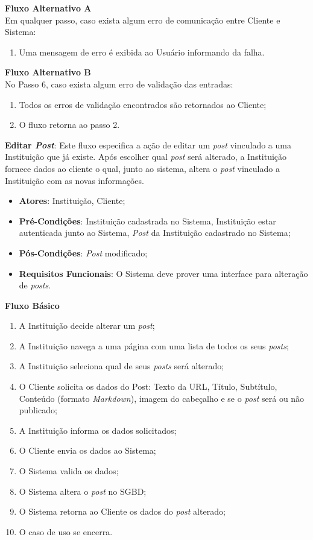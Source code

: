 \begin{anexosenv}
\begin{lista}
    \textbf{Fluxo Alternativo A} \\
    Em qualquer passo, caso exista algum erro de comunicação entre Cliente e Sistema:
    \begin{enumerate}
    \item Uma mensagem de erro é exibida ao Usuário informando da falha.
    \end{enumerate}
    
    \textbf{Fluxo Alternativo B} \\
    No Passo 6, caso exista algum erro de validação das entradas:
    \begin{enumerate}
    \item Todos os erros de validação encontrados são retornados ao Cliente;
    \item O fluxo retorna ao passo 2.
    \end{enumerate}
  
  
  
  \item \textbf{Editar \emph{Post}}: Este fluxo especifica a ação de editar um \emph{post} vinculado a uma Instituição que já existe. Após escolher qual \emph{post} será alterado, a Instituição fornece dados ao cliente o qual, junto ao sistema, altera o \emph{post} vinculado a Instituição com as novas informações.
    \begin{itemize}
    \item \textbf{Atores}: Instituição, Cliente;
    \item \textbf{Pré-Condições}: Instituição cadastrada no Sistema, Instituição estar autenticada junto ao Sistema, \emph{Post} da Instituição cadastrado no Sistema;
    \item \textbf{Pós-Condições}: \emph{Post} modificado;
    \item \textbf{Requisitos Funcionais}: O Sistema deve prover uma interface para alteração de \emph{posts}.
    \end{itemize}
	
    \textbf{Fluxo Básico}
    \begin{enumerate}
    \item A Instituição decide alterar um \emph{post};
    \item A Instituição navega a uma página com uma lista de todos os seus \emph{posts};
    \item A Instituição seleciona qual de seus \emph{posts} será alterado;
    \item O Cliente solicita os dados do Post: Texto da URL, Título, Subtítulo, Conteúdo (formato \emph{Markdown}), imagem do cabeçalho e se o \emph{post} será ou não publicado;
    \item A Instituição informa os dados solicitados;
    \item O Cliente envia os dados ao Sistema;
    \item O Sistema valida os dados;
    \item O Sistema altera o \emph{post} no SGBD;
    \item O Sistema retorna ao Cliente os dados do \emph{post} alterado;
    \item O caso de uso se encerra.
    \end{enumerate}
    

\end{lista}
\end{anexosenv}
